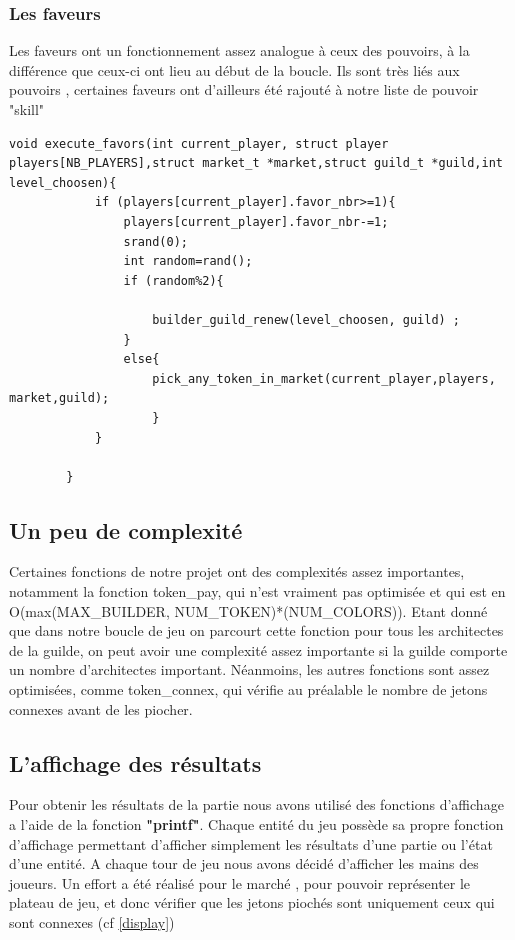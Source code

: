 \documentclass{article}
\begin{document}
            \subsubsection{Les faveurs}
            \hspace{1em} Les faveurs ont un fonctionnement assez analogue à ceux des pouvoirs, à la différence que ceux-ci ont lieu au début de la boucle. Ils sont très liés aux pouvoirs , certaines faveurs ont d'ailleurs été rajouté à notre liste de pouvoir "skill"
        
        \begin{lstlisting}[frame=single, caption={Exécution des faveurs},label=execute_pouvoirs]
        void execute_favors(int current_player, struct player players[NB_PLAYERS],struct market_t *market,struct guild_t *guild,int level_choosen){
        	if (players[current_player].favor_nbr>=1){
        		players[current_player].favor_nbr-=1;
        		srand(0);
        		int random=rand();
        		if (random%2){
        			
        			builder_guild_renew(level_choosen, guild) ;
        		}
        		else{
        			pick_any_token_in_market(current_player,players, market,guild);
        			}
        	}
        
        }
        \end{lstlisting}
        
    \subsection{Un peu de complexité}
    \hspace{1em} Certaines fonctions de notre projet ont des complexités assez importantes, notamment la fonction token\_pay, qui n'est vraiment pas optimisée et qui est en O(max(MAX\_BUILDER, NUM\_TOKEN)*(NUM\_COLORS)). 
    Etant donné que dans notre boucle de jeu on parcourt cette fonction pour tous les architectes de la guilde, on peut avoir une complexité assez importante si la guilde comporte un nombre d'architectes important.
    Néanmoins, les autres fonctions sont assez optimisées, comme token\_connex, qui vérifie au préalable le nombre de jetons connexes avant de les piocher.
    \subsection{L'affichage des résultats}
        Pour obtenir les résultats de la partie nous avons utilisé des fonctions d'affichage a l'aide de la fonction \textbf{"printf"}. Chaque entité du jeu possède sa propre fonction d'affichage permettant d'afficher simplement les résultats d'une partie ou l'état d'une entité. A chaque tour de jeu nous avons décidé d'afficher les mains des joueurs. Un effort a été réalisé pour le marché , pour pouvoir
        représenter le plateau de jeu, et donc vérifier que les jetons piochés sont uniquement ceux qui sont connexes (cf \ref{display})
\end{document}
